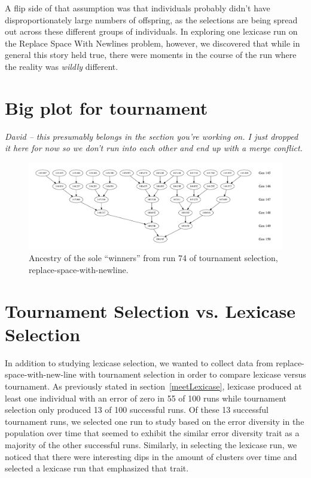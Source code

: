 A flip side of that assumption was that individuals probably didn't have disproportionately 
large numbers of offspring, as the selections are being spread out across these different groups
of individuals. In exploring one lexicase run on the Replace Space With Newlines problem, however,
we discovered that while in general this story held true, there were moments in the course of the run
where the reality was \emph{wildly} different.

\section{Big plot for tournament}

\emph{David – this presumably belongs in the section you're working on. I just dropped it here
	for now so we don't run into each other and end up with a merge conflict.}

\begin{figure}
	\vspace{0.6\columnwidth}
	\includegraphics[width=\columnwidth]{figures/ancestors_of_winner_rswn_tourney_run74.pdf}
	\caption{Ancestry of the sole ``winners'' from run 74 of tournament selection, 
		replace-space-with-newline.}
	\label{fig:winnerAncestorsTourneyRun74}
\end{figure}

\section{Tournament Selection vs. Lexicase Selection}
\label{sec:1}


In addition to studying lexicase selection, we wanted to collect data from replace-space-with-new-line with tournament selection in order to compare lexicase versus tournament. As previously stated in section~\ref{meetLexicase}, lexicase  produced at least one individual with an error of zero in 55 of 100 runs while tournament selection only produced 13 of 100 successful runs. Of these 13 successful tournament runs, we selected one run to study based on the error diversity in the population over time that seemed to exhibit the similar error diversity trait as a majority of the other successful runs. Similarly, in selecting the lexicase run, we noticed that there were interesting dips in the amount of clusters over time and selected a lexicase run that emphasized that trait. 

